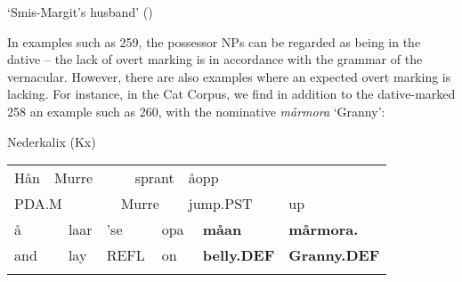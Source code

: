 \begin{styleTranslation}
‘Smis-Margit’s husband’ (\citet[97]{Levander1909})

\end{styleTranslation}

\begin{styleBodyTextFirst}
In examples such as 259, the possessor NPs can be regarded as being in the dative – the lack of overt marking is in accordance with the grammar of the vernacular. However, there are also examples where an expected overt marking is lacking. For instance, in the Cat Corpus, we find in addition to the dative-marked 258 an example such as 260, with the nominative \textit{mårmora} ‘Granny’: 

\end{styleBodyTextFirst}

\begin{listWWNumileveli}
\item {}

\begin{styleExample}
\label{bkm:Ref110681866}Nederkalix (Kx)

\end{styleExample}

\end{listWWNumileveli}

\begin{tabular}{llllllllll}
\lsptoprule
Hån & \multicolumn{4}{l}{Murre

} & \multicolumn{2}{l}{sprant

} & \multicolumn{2}{l}{åopp

} & \\
\multicolumn{4}{l}{PDA.M

} & \multicolumn{3}{l}{Murre

} & \multicolumn{2}{l}{jump.PST

} & up\\
\multicolumn{2}{l}{å

} & laar & \multicolumn{3}{l}{’se

} & \multicolumn{2}{l}{opa

} & {\bfseries måan} & {\bfseries mårmora.}\\
\multicolumn{2}{l}{and

} & lay & \multicolumn{3}{l}{REFL

} & \multicolumn{2}{l}{on

} & {\bfseries belly.DEF} & {\bfseries Granny.DEF}\\
\lspbottomrule
\end{tabular}

